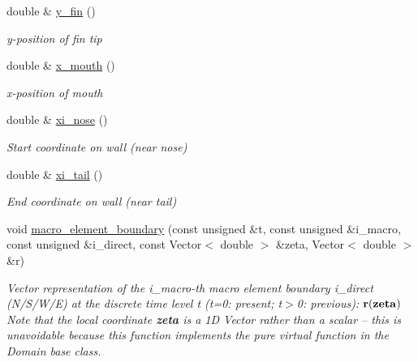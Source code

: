 \begin{DoxyCompactItemize}
double \& \hyperlink{classoomph_1_1FishDomain_ae1a869cee7946b178a09214725e27f29}{y\+\_\+fin} ()
\begin{DoxyCompactList}\small\item\em y-\/position of fin tip \end{DoxyCompactList}\item 
double \& \hyperlink{classoomph_1_1FishDomain_adf87e9ae261cc914173bc18d7eb5bfd8}{x\+\_\+mouth} ()
\begin{DoxyCompactList}\small\item\em x-\/position of mouth \end{DoxyCompactList}\item 
double \& \hyperlink{classoomph_1_1FishDomain_a773b98977806c2b27531425ecf5e3f8e}{xi\+\_\+nose} ()
\begin{DoxyCompactList}\small\item\em Start coordinate on wall (near nose) \end{DoxyCompactList}\item 
double \& \hyperlink{classoomph_1_1FishDomain_ae2bcc0014506ba2225b928f319a27c9d}{xi\+\_\+tail} ()
\begin{DoxyCompactList}\small\item\em End coordinate on wall (near tail) \end{DoxyCompactList}\item 
void \hyperlink{classoomph_1_1FishDomain_a383b0fb396d605932ba6fb0779dacbf9}{macro\+\_\+element\+\_\+boundary} (const unsigned \&t, const unsigned \&i\+\_\+macro, const unsigned \&i\+\_\+direct, const Vector$<$ double $>$ \&zeta, Vector$<$ double $>$ \&r)
\begin{DoxyCompactList}\small\item\em Vector representation of the i\+\_\+macro-\/th macro element boundary i\+\_\+direct (N/\+S/\+W/E) at the discrete time level t (t=0\+: present; t$>$0\+: previous)\+: $ {\bf r}({\bf zeta}) $ Note that the local coordinate {\bfseries zeta} is a 1D Vector rather than a scalar -- this is unavoidable because this function implements the pure virtual function in the Domain base class. \end{DoxyCompactList}\end{DoxyCompactItemize}
